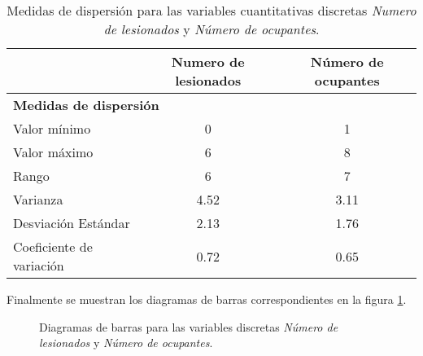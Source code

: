\begin{table}[!htbp]
    \begin{footnotesize}
        \centering
        \begin{tabular}{lc|c}
            \toprule
            {} & \textbf{Numero de lesionados} & \textbf{Número de ocupantes} \\
            \bottomrule
            \toprule
            \multicolumn{3}{l}{\textbf{Medidas de dispersión}} \\
            \bottomrule
            \toprule
            Valor mínimo & 0 & 1 \\
            \midrule
            Valor máximo & 6 & 8 \\
            \midrule
            Rango & 6 & 7 \\
            \midrule
            Varianza & 4.52 & 3.11 \\
            \midrule
            Desviación Estándar & 2.13 & 1.76 \\
            \midrule
            Coeficiente de variación & 0.72 & 0.65 \\
            \bottomrule
        \end{tabular}
        \caption{\footnotesize{Medidas de dispersión para las variables cuantitativas discretas  \emph{Numero de lesionados} y \emph{Número de ocupantes}.}}
        \label{tab:variablesDiscretasMedidasDispersion}
    \end{footnotesize}
\end{table}
\newpage
Finalmente se muestran los diagramas de barras correspondientes en la figura \ref{fig:diagramasBarrasVariablesDiscretas}.\par
\begin{figure}[!ht]
    \centering
    \noindent\parbox[][][c]{.5\linewidth}{
        
    }
    \parbox[][][c]{.4\linewidth}{
        
    }\par
    \caption{\footnotesize{Diagramas de barras para las variables discretas \emph{Número de lesionados} y \emph{Número de ocupantes}.}}
    \label{fig:diagramasBarrasVariablesDiscretas}
\end{figure}
